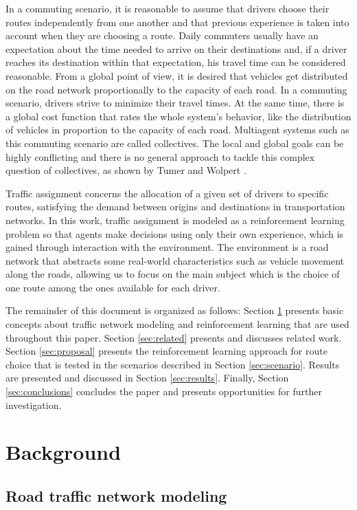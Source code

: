 \documentclass{RITA}
\begin{document}
In a commuting scenario, it is reasonable to assume that drivers choose their routes independently from one another and that previous experience is taken into account when they are choosing a route. Daily commuters usually have an expectation about the time needed to arrive on their destinations and, if a driver reaches its destination within that expectation, his travel time can be considered  reasonable. From a global point of view, it is desired that vehicles get distributed on the road network proportionally to the capacity of each road. In a commuting scenario, drivers strive to minimize their travel times. At the same time, there is a global cost function that rates the whole system's behavior, like the distribution of vehicles in proportion to the capacity of each road. Multiagent systems such as this commuting scenario are called collectives. The local and global goals can be highly conflicting and there is no general approach to tackle this complex question of collectives, as shown by Tumer and Wolpert \cite{Tumer&Wolpert2004}.

Traffic assignment concerns the allocation of a given set of drivers to specific routes, satisfying the demand between origins and destinations in transportation networks. In this work, traffic assignment is modeled as a reinforcement learning problem so that agents make decisions using only their own experience, which is gained through interaction with the environment. The environment is a road network that abstracts some real-world characteristics such as vehicle movement along the roads, allowing us to focus on the main subject which is the choice of one route among the ones available for each driver.

The remainder of this document is organized as follows: Section \ref{sec:concepts} presents basic concepts about traffic network modeling and reinforcement learning that are used throughout this paper. Section \ref{sec:related} presents and discusses related work. Section \ref{sec:proposal} presents the reinforcement learning approach for route choice that is tested in the scenarios described in Section \ref{sec:scenario}. Results are presented and discussed in Section \ref{sec:results}. Finally, Section \ref{sec:conclusions} concludes the paper and presents opportunities for further investigation.

\section{Background}
\label{sec:concepts}
\subsection{Road traffic network modeling}
\end{document}
